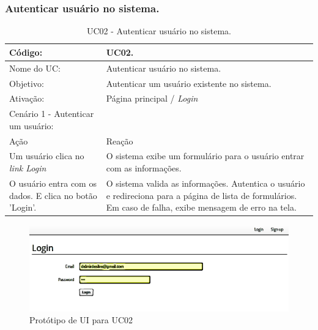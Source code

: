 \documentclass[11pt]{article}
\begin{document}
    \clearpage

      \subsubsection{Autenticar usuário no sistema.}

        \begin{table}[h]
          \begin{center}
            \begin{tabular}{ | p{7cm} | p{8cm} | }
              \hline
              Código: \cellcolor{gray} & UC02. \\
              \hline
              Nome do UC: \cellcolor{gray} & Autenticar usuário no sistema. \\
              \hline
              Objetivo: \cellcolor{gray} & Autenticar um usuário existente no sistema. \\
              \hline
              Ativação: \cellcolor{gray} & Página principal / \em Login \\
              \hline
              \hline
              Cenário 1 - Autenticar um usuário: &  \\
              \hline
              Ação\cellcolor{gray} & Reação\cellcolor{gray} \\
              \hline
              Um usuário clica no \em link Login & O sistema exibe um formulário para o usuário entrar com as informações. \\
              \hline
              O usuário entra com os dados. E clica no botão 'Login'. & O sistema valida as informações. Autentica o usuário e redireciona para a página de lista de formulários. Em caso de falha, exibe mensagem de erro na tela. \\
              \hline
            \end{tabular}
            \caption{UC02 - Autenticar usuário no sistema.}
          \end{center}
        \end{table}
        
        \begin{figure}[h!]
          \centering
          \includegraphics[width=.9\textwidth]{authenticate_user.png}
          \caption{Protótipo de UI para UC02}
        \end{figure}
\end{document}
